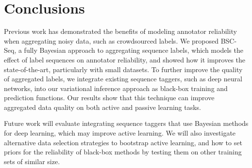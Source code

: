 \section{Conclusions}

Previous work has demonstrated the benefits of modeling annotator reliability when aggregating noisy data, 
such as crowdsourced labels. 
We proposed BSC-Seq, a fully Bayesian approach to aggregating sequence labels, 
which models the effect of label sequences on annotator reliability,
and showed how it improves the state-of-the-art, particularly with small datasets.
To further improve the quality of aggregated labels,
we integrate existing 
sequence taggers, such as deep neural networks, into our variational inference approach as black-box training and prediction functions.
Our results show that this technique can improve aggregated data quality
on both active and passive learning tasks.

Future work will evaluate integrating sequence taggers that use
Bayesian methods for deep learning, 
which may improve active learning.
We will also investigate
alternative data selection strategies to bootstrap active learning, 
and how to set priors for %
the reliability of black-box methods by testing them
on other training sets of similar size.


